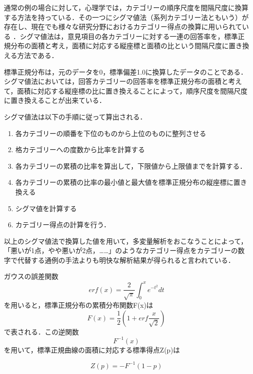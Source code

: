 \documentclass[shuuron]{kuee}
\begin{document}
通常の例の場合に対して，心理学では，カテゴリーの順序尺度を間隔尺度に換算する方法を持っている．その一つにシグマ値法（系列カテゴリー法ともいう）が存在し\cite{likert1932technique}、現在でも様々な研究分野におけるカテゴリー得点の換算に用いられている\cite{シグマ値法使ってる} \cite{岩本隆2016人事}．シグマ値法は，意見項目の各カテゴリーに対する一連の回答率を，標準正規分布の面積と考え，面積に対応する縦座標と面積の比という間隔尺度に置き換える方法である．

標準正規分布は，元のデータを0，標準偏差1.0に換算したデータのことである．シグマ値法においては，回答カテゴリーの回答率を標準正規分布の面積と考えて，面積に対応する縦座標の比に置き換えることによって，順序尺度を間隔尺度に置き換えることが出来ている．

シグマ値法は以下の手順に従って算出される．
\begin{enumerate}
  \item 各カテゴリーの順番を下位のものから上位のものに整列させる
  \item 格カテゴリーへの度数から比率を計算する
  \item 各カテゴリーの累積の比率を算出して，下限値から上限値までを計算する．
  \item 各カテゴリーの累積の比率の最小値と最大値を標準正規分布の縦座標に置き換える
  \item シグマ値を計算する
  \item カテゴリー得点の計算を行う．
\end{enumerate}

以上のシグマ値法で換算した値を用いて，多変量解析をおこなうことによって，「悪いが1点，やや悪いが2点，……」のようなカテゴリー得点をカテゴリーの数字で代替する通例の手法よりも明快な解析結果が得られると言われている．

ガウスの誤差関数
\begin{equation}
  erf(x) = \frac{2}{\sqrt{\pi}}\int_0^x e^{-t^2} dt
\end{equation}
を用いると，標準正規分布の累積分布関数F(x)は
\begin{equation}
  F(x) = \frac{1}{2}(1+erf\frac{x}{\sqrt{2}})
\end{equation}
で表される．この逆関数\begin{equation}F^{-1}(x)\end{equation}を用いて，標準正規曲線の面積に対応する標準得点Z(p)は


\begin{equation}
  Z(p) = -F^{-1}(1-p)
\end{equation}
\end{document}
